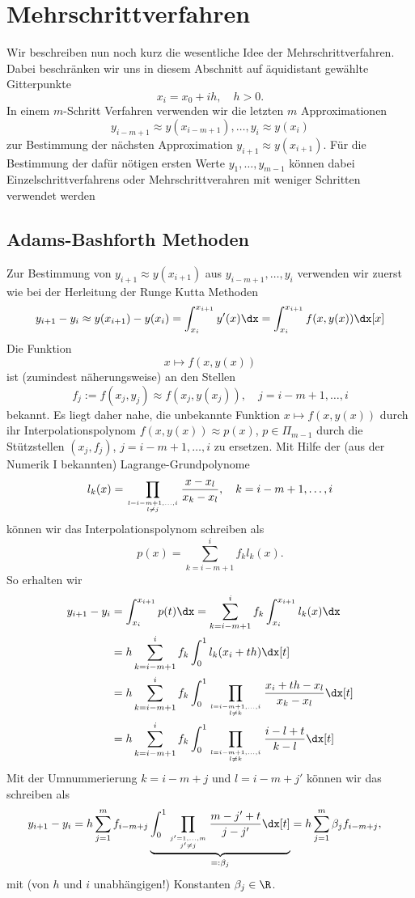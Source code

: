 \documentclass[
]{mycourse}
\theoremstyle{mythm}
\theoremstyle{break}
\begin{document}
\section{Mehrschrittverfahren}

Wir beschreiben nun noch kurz die wesentliche Idee der Mehrschrittverfahren. 
Dabei beschränken wir uns in diesem Abschnitt auf äquidistant gewählte Gitterpunkte 
\[
x_i=x_0+ih, \quad h>0. 
\]
In einem $m$-Schritt Verfahren verwenden wir die letzten $m$ Approximationen
\[
y_{i-m+1}\approx y(x_{i-m+1}),\ldots, y_{i}\approx y(x_{i})
\]
zur Bestimmung der nächsten Approximation $y_{i+1}\approx y(x_{i+1})$.
Für die Bestimmung der dafür nötigen ersten Werte $y_1,\ldots, y_{m-1}$ 
können dabei Einzelschrittverfahrens oder Mehrschrittverahren mit weniger Schritten 
verwendet werden

\subsection{Adams-Bashforth Methoden}\label{subsect:adam_bashforth}
Zur Bestimmung von $y_{i+1}\approx y(x_{i+1})$ aus $y_{i-m+1},\ldots,y_i$ 
verwenden wir zuerst wie bei der
Herleitung der Runge Kutta Methoden
\[
y_{i+1}-y_i\approx y(x_{i+1})-y(x_i)=\int_{x_i}^{x_{i+1}} y'(x) \dx
=\int_{x_i}^{x_{i+1}} f(x,y(x)) \dx[x]
\]
Die Funktion 
\[
x\mapsto f(x,y(x))
\]
ist (zumindest näherungsweise) an den Stellen 
\[
f_j:=f(x_j,y_j)\approx f(x_j,y(x_j)), \quad j=i-m+1,\ldots,i
\]
bekannt. Es liegt daher nahe, die unbekannte Funktion $x\mapsto f(x,y(x))$ durch ihr 
Interpolationspolynom $f(x,y(x))\approx p(x)$, $p\in \Pi_{m-1}$ durch die Stützstellen $(x_j,f_j)$, $j=i-m+1,\ldots,i$ zu ersetzen. 
Mit Hilfe der (aus der Numerik I bekannten) Lagrange-Grundpo\-ly\-no\-me
\[
l_k(x)=\prod_{l=i-m+1,\dots,i \atop l\neq j} \frac{x-x_l}{x_k-x_l}, \quad k=i-m+1,\ldots,i
\]
können wir das Interpolationspolynom schreiben als
\[
p(x)=\sum_{k=i-m+1}^i f_k l_k(x).
\]
So erhalten wir
\begin{align*}
y_{i+1}-y_i&= \int_{x_{i}}^{x_{i+1}} p(t) \dx
=\sum_{k=i-m+1}^i f_k \int_{x_{i}}^{x_{i+1}} l_k(x)\dx\\
&=h \sum_{k=i-m+1}^i f_k \int_0^1 l_k(x_i+th)\dx[t]\\
&= h \sum_{k=i-m+1}^i f_k \int_0^1 \prod_{l=i-m+1,\dots,i \atop l\neq k} \frac{x_i+th - x_l}{x_k-x_l}\dx[t]\\
&= h \sum_{k=i-m+1}^i f_k \int_0^1 \prod_{l=i-m+1,\dots,i \atop l\neq k}
 \frac{i-l+t}{k-l}\dx[t]
\end{align*}
Mit der Umnummerierung $k=i-m+j$ und $l=i-m+j'$ können wir das schreiben als
\begin{align*}
y_{i+1}-y_i&= h \sum_{j=1}^m f_{i-m+j} \underbrace{\int_0^1 \prod_{j'=1,\ldots,m \atop j'\neq j}
 \frac{m-j'+t}{j-j'}\dx[t]}_{=:\beta_j}
=h\sum_{j=1}^m\beta_j f_{i-m + j},
\end{align*}
mit (von $h$ und $i$ unabhängigen!) Konstanten $\beta_j\in \R$.
\end{document}
